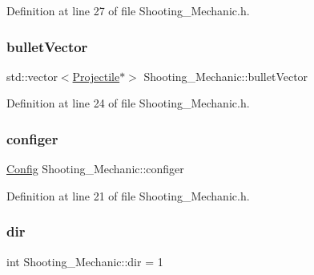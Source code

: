 Definition at line 27 of file Shooting\+\_\+\+Mechanic.\+h.

\hypertarget{class_shooting___mechanic_a9fb5ad128dfb480bbb8174b07be01d92}{}\label{class_shooting___mechanic_a9fb5ad128dfb480bbb8174b07be01d92} 
\subsubsection{\texorpdfstring{bullet\+Vector}{bulletVector}}
{\footnotesize\ttfamily std\+::vector$<$\hyperlink{class_projectile}{Projectile}$\ast$$>$ Shooting\+\_\+\+Mechanic\+::bullet\+Vector\hspace{0.3cm}{\ttfamily [protected]}}



Definition at line 24 of file Shooting\+\_\+\+Mechanic.\+h.

\hypertarget{class_shooting___mechanic_a69eb7f584def4225d9d0047f54489035}{}\label{class_shooting___mechanic_a69eb7f584def4225d9d0047f54489035} 
\subsubsection{\texorpdfstring{configer}{configer}}
{\footnotesize\ttfamily \hyperlink{class_config}{Config} Shooting\+\_\+\+Mechanic\+::configer\hspace{0.3cm}{\ttfamily [protected]}}



Definition at line 21 of file Shooting\+\_\+\+Mechanic.\+h.

\hypertarget{class_shooting___mechanic_ac278fe303596d7b0f20e28ff8b4a8ed4}{}\label{class_shooting___mechanic_ac278fe303596d7b0f20e28ff8b4a8ed4} 
\subsubsection{\texorpdfstring{dir}{dir}}
{\footnotesize\ttfamily int Shooting\+\_\+\+Mechanic\+::dir = 1\hspace{0.3cm}{\ttfamily [protected]}}



